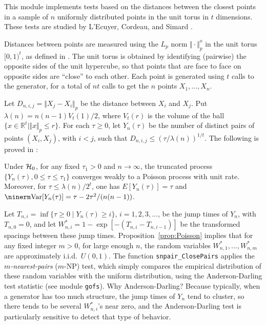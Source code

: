 
This module implements tests based on the distances between
the closest points in a sample of $n$ uniformly distributed points in
the unit torus in $t$ dimensions.
These tests are studied by L'Ecuyer, Cordeau, and Simard \cite{rLEC00c}.

Distances between points are measured using the $L_p$ norm
$\Vert\cdot\Vert_p^o$ in the unit torus $[0,1)^t$,
as defined in \cite{rLEC00c}.
The unit torus is obtained by identifying (pairwise) the opposite
sides of the unit hypercube, so that points that are face to face on
opposite sides are ``close'' to each other.
Each point is generated using $t$ calls to the generator, for a total
of $nt$ calls to get the $n$ points $X_1,\dots,X_n$.

Let $D_{n,i,j} = \Vert X_j - X_i\Vert_p$
be the distance between $X_i$ and $X_j$.
Put $\lambda(n) = n(n-1)V_t(1)/2$, where $V_t(r)$
is the volume of the ball $\{x \in \mathbb{R}^t \mid \Vert x\Vert_p \le r\}$.
For each $\tau\ge 0$, let $Y_n(\tau)$ be the number of distinct pairs
of points $(X_i, X_j)$, with $i<j$, such that
$D_{n,i,j} \le (\tau/\lambda(n))^{1/t}$.
The following is proved in \cite{rLEC00c}:

\begin {proposition}                      \label{prop:Poisson}
Under $\mathcal{H}_0$, for any fixed $\tau_1 > 0$ and $n\to\infty$,
the truncated process $\{Y_n(\tau), 0\le \tau\le \tau_1\}$
converges weakly to a Poisson process with unit rate.
Moreover, for $\tau\le \lambda(n) /2^{t}$, one has
$E[Y_n(\tau)] = \tau$ and $\Var[Y_n(\tau)] = \tau - {2\tau^2 / (n(n-1))}$.
\end {proposition}

Let $T_{n,i} = \inf\{\tau\ge 0 \mid Y_n(\tau) \ge i\}$, $i=1,2,3,\dots$,
be the jump times of $Y_n$, with $T_{n,0}=0$, and let
$W^*_{n,i} = 1-\exp[-(T_{n,i} - T_{n,i-1})]$ be the transformed
spacings between these jump times.
Proposition~\ref{prop:Poisson} implies that for any fixed integer $m > 0$,
for large enough $n$, the random variables $W^*_{n,1},\dots,W^*_{n,m}$
are approximately i.i.d.\ $U(0,1)$.
The function {\tt snpair\_ClosePairs} applies the
{\em $m$-nearest-pairs\/} ({$m$-NP}) test,
which simply compares the empirical distribution of these random
variables with the uniform distribution,
using the Anderson-Darling test statistic (see module {\tt gofs}).
Why Anderson-Darling?  Because typically, when a generator has too
much structure, the jump times of $Y_n$ tend to cluster, so there tends
to be several $W^*_{n,i}$'s near zero, and the Anderson-Darling test
is particularly sensitive to detect that type of behavior.

